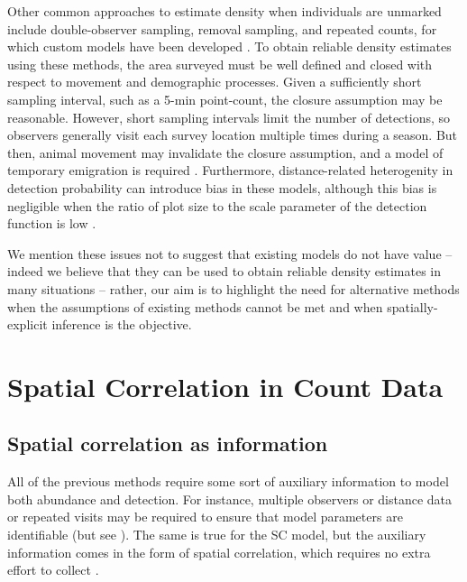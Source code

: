 Other common approaches to estimate density when individuals are
unmarked include double-observer sampling, removal sampling, and
repeated counts, for which custom models have been developed
\citep{nichols_etal:2000, farnsworth_etal:2002, royle:2004biom,
  royle:2004abc, nichols_etal:2009,fiske_chandler:2011}. To
obtain reliable density estimates using these
methods, the area surveyed must be well defined and closed with
respect to movement and demographic processes. Given a sufficiently short
sampling interval, such as a 5-min point-count, the closure
assumption may be reasonable. However, short sampling intervals limit
the number of detections, so observers generally visit each survey
location multiple times during a season. But then, animal
movement may invalidate the closure assumption, and a model of
temporary emigration is required
\citep{kendall_etal:1997,chandler_etal:2011}. Furthermore,
distance-related heterogenity in detection probability can introduce
bias in these models, although this bias is negligible when the
ratio of plot size to the scale parameter of the detection function is low
\citep{efford_dawson:2009}.

We mention these issues not to suggest that existing models do not
have value -- indeed we believe that they can be used to obtain
reliable density estimates in many situations -- rather, our aim is to
highlight the need for alternative methods when the assumptions of
existing methods cannot be met and when spatially-explicit inference
is the objective. %


\section{Spatial Correlation in Count Data}

\subsection{Spatial correlation as information}
\label{sect.corr-info}

All of the previous methods require some sort of auxiliary information
to model both abundance and detection. For instance, %
multiple observers or distance data or repeated visits
may be required
to ensure
that model parameters are identifiable (but see
  \citep{lele_etal:2012, solymos_etal:2012}). The same is true for
the SC model, but the auxiliary information comes in the form of spatial
correlation, which requires no extra effort to collect
\citep{chandler_royle:2012}. %

